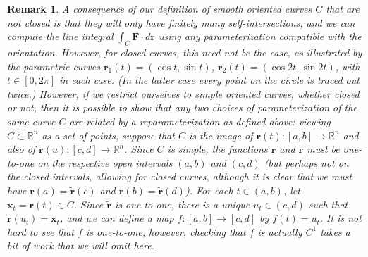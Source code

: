 \documentclass[12pt,letterpaper]{article}
\newtheorem{rem}[theorem]{Remark}
\newenvironment{remark}{\begin{rem}\rm}{\end{rem}}
\newcommand{\R}{\mathbb{R}}
\newcommand{\x}{\mathbf{x}}
\renewcommand{\r}{\mathbf{r}}
\begin{document}
\begin{remark}
A consequence of our definition of smooth oriented curves $C$ that are not closed is that they will only have finitely many self-intersections, and we can compute the line integral $\int_C \mathbf{F}\cdot d\r$ using any parameterization compatible with the orientation. However, for closed curves, this need not be the case, as illustrated by the parametric curves $\r_1(t)=(\cos t,\sin t)$, $\r_2(t) = (\cos 2t, \sin 2t)$, with $t\in [0,2\pi]$ in each case. (In the latter case every point on the circle is traced out twice.) However, if we restrict ourselves to {\em simple} oriented curves, whether closed or not, then it is possible to show that any two choices of parameterization of the same curve $C$ are related by a reparameterization as defined above: viewing $C\subset \R^n$ as a set of points, suppose that $C$ is the image of $\r(t):[a,b]\to \R^n$ and also of $\tilde{\r}(u):[c,d]\to \R^n$. Since $C$ is simple, the functions $\r$ and $\tilde{\r}$ must be one-to-one on the respective open intervals $(a,b)$ and $(c,d)$ (but perhaps not on the closed intervals, allowing for closed curves, although it is clear that we must have $\r(a)=\tilde{\r}(c)$ and $\r(b)=\tilde{\r}(d)$). For each $t\in (a,b)$, let $\x_t=\r(t)\in C$. Since $\tilde{\r}$ is one-to-one, there is a unique $u_t\in (c,d)$ such that $\tilde{\r}(u_t)=\x_t$, and we can define a map $f:[a,b]\to [c,d]$ by $f(t)=u_t$. It is not hard to see that $f$ is one-to-one; however, checking that $f$ is actually $C^1$ takes a bit of work that we will omit here.
\end{remark}
\end{document}
